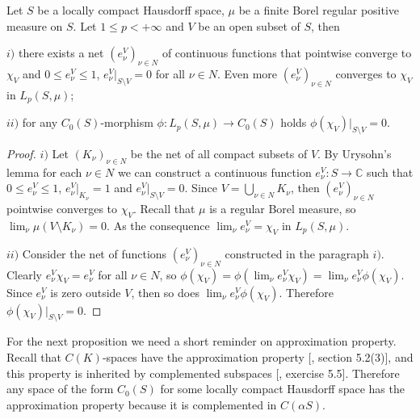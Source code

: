 \begin{proposition}\label{SuppsOfSomeFuncInC0SAndLp} Let $S$ be a locally compact Hausdorff space, $\mu$ be a finite Borel regular positive measure on $S$. Let $1\leq p<+\infty$ and $V$ be an open subset of $S$, then

$i)$ there exists a net $(e_\nu^V)_{\nu\in N}$ of continuous functions that pointwise converge to $\chi_V$ and $0\leq e_\nu^V\leq 1$, $e_\nu^V|_{S\setminus V}=0$ for all $\nu\in N$. Even more $(e_\nu^V)_{\nu\in N}$ converges to $\chi_V$ in $L_p(S,\mu)$; 

$ii)$ for any $C_0(S)$-morphism $\phi:L_p(S,\mu)\to C_0(S)$ holds $\phi(\chi_V)|_{S\setminus V}=0$.
\end{proposition}
\begin{proof} $i)$ Let $(K_\nu)_{\nu\in N}$ be the net of all compact subsets of $V$. By Urysohn's lemma for each $\nu\in N$ we can construct a continuous function $e_\nu^V:S\to\mathbb{C}$ such that $0\leq e_\nu^V\leq 1$, $e_\nu^V|_{K_\nu}=1$ and $e_\nu^V|_{S\setminus V}=0$. Since $V=\bigcup_{\nu\in N} K_\nu$, then $(e_\nu^V)_{\nu\in N}$ pointwise converges to $\chi_V$. Recall that $\mu$ is a regular Borel measure, so $\lim_\nu\mu(V\setminus K_\nu)=0$. As the consequence $\lim_\nu e_\nu^V=\chi_V$ in $L_p(S,\mu)$.

$ii)$ Consider the net of functions $(e_\nu^V)_{\nu\in N}$ constructed in the paragraph $i)$. Clearly $e_\nu^V\chi_V=e_\nu^V$ for all $\nu\in N$, so $\phi(\chi_V)=\phi(\lim_\nu e_\nu^V\chi_V)=\lim_\nu e_\nu^V\phi(\chi_V)$. Since $e_\nu^V$ is zero outside $V$, then so does $\lim_\nu e_\nu^V\phi(\chi_V)$. Therefore $\phi(\chi_V)|_{S\setminus V}=0$.
\end{proof}

For the next proposition we need a short reminder on approximation property. Recall that $C(K)$-spaces have the approximation property [\cite{DefFloTensNorOpId}, section 5.2(3)], and this property is inherited by complemented subspaces [\cite{DefFloTensNorOpId}, exercise 5.5]. Therefore any space of the form $C_0(S)$ for some locally compact Hausdorff space has the approximation property because it is complemented in $C(\alpha S)$.

